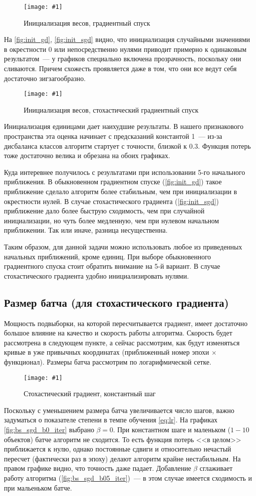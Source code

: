 \documentclass[12pt]{article}
\newcommand{\mpl}[2]{
    \begin{figure}[!h]
        \texttt{[image: \#1]}
        \centering
        \caption{#2}
        \label{fig:#1}
     \end{figure}
}
\begin{document}
\mpl{init_gd}{Инициализация весов, градиентный спуск}

На \autoref{fig:init_gd}, \autoref{fig:init_sgd} видно, что инициализация случайными значениями в окрестности 0 или непосредственно нулями приводит примерно к одинаковым результатом~--- у графиков специально включена прозрачность, поскольку они сливаются. Причем схожесть проявляется даже в том, что они все ведут себя достаточно зигзагообразно.

\mpl{init_sgd}{Инициализация весов, стохастический градиентный спуск}

Инициализация единицами дает наихудшие результаты. В нашего признакового пространства эта оценка начинает с предсказаний константой 1~--- из-за дисбаланса классов алгоритм стартует с точности, близкой к $0.3$. Функция потерь тоже достаточно велика и обрезана на обоих графиках. 

Куда интеревнее получилось с результатами при использовании 5-го начального приближения. В обыкновенном градиентном спуске (\autoref{fig:init_gd}) такое приближение сделало алгоритм более стабильным, чем при инициализации в окрестности нулей. В случае стохастического градиента (\autoref{fig:init_sgd}) приближение дало более быструю сходимость, чем при случайной инициализации, но чуть более медленную, чем при нулевом начальном приближении. Так или иначе, разница несущественна.

Таким образом, для данной задачи можно использовать любое из приведенных начальных приближений, кроме единиц. При выборе обыкновенного градиентного спуска стоит обратить внимание на 5-й вариант. В случае стохастического градиента удобно инициализировать нулями.

\subsection{Размер батча (для стохастического градиента)}
Мощность подвыборки, на которой пересчитывается градиент, имеет достаточно большое влияние на качество и скорость работы алгоритма. Скорость будет рассмотрена в следующем пункте, а сейчас рассмотрим, как будут изменяться кривые в уже привычных координатах (приближенный номер эпохи $\times$ функционал). Размеры батча рассмотрим по логарифмической сетке.

\mpl{bs_sgd_b0_iter}{Стохастический градиент, константный шаг}

Поскольку с уменьшением размера батча увеличивается число шагов, важно задуматься о показателе степени в темпе обучения \autoref{eq:lr}. На графиках \autoref{fig:bs_sgd_b0_iter} выбрано $\beta=0$. При константном шаге и маленьком ($1-10$ объектов) батче алгоритм не сходится. То есть функция потерь <<в целом>> приближается к нулю, однако постоянные сдвиги и относительно нечастый пересчет (фактически раз в эпоху) делают алгоритм крайне нестабильным. На правом графике видно, что точность даже падает. Добавление $\beta$ сглаживает работу алгоритма (\autoref{fig:bs_sgd_b05_iter})~--- в этом случае имеется сходимость и при мальеньком батче.
\end{document}
